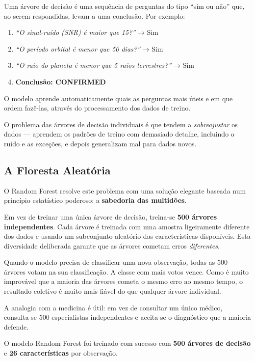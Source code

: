 \documentclass[12pt, a4paper]{report}
\begin{document}
Uma árvore de decisão é uma sequência de perguntas do tipo ``sim ou não'' que, ao serem respondidas, levam a uma conclusão. Por exemplo:

\begin{enumerate}
    \item \textit{``O sinal-ruído (SNR) é maior que 15?''} → Sim
    \item \textit{``O período orbital é menor que 50 dias?''} → Sim
    \item \textit{``O raio do planeta é menor que 5 raios terrestres?''} → Sim
    \item \textbf{Conclusão: CONFIRMED}
\end{enumerate}

O modelo aprende automaticamente quais as perguntas mais úteis e em que ordem fazê-las, através do processamento dos dados de treino.

O problema das árvores de decisão individuais é que tendem a \textit{sobreajustar} os dados — aprendem os padrões de treino com demasiado detalhe, incluindo o ruído e as exceções, e depois generalizam mal para dados novos.

\subsection{A Floresta Aleatória}

O Random Forest resolve este problema com uma solução elegante baseada num princípio estatístico poderoso: a \textbf{sabedoria das multidões}.

Em vez de treinar uma única árvore de decisão, treina-se \textbf{500 árvores independentes}. Cada árvore é treinada com uma amostra ligeiramente diferente dos dados e usando um subconjunto aleatório das características disponíveis. Esta diversidade deliberada garante que as árvores cometam erros \textit{diferentes}.

Quando o modelo precisa de classificar uma nova observação, todas as 500 árvores votam na sua classificação. A classe com mais votos vence. Como é muito improvável que a maioria das árvores cometa o mesmo erro ao mesmo tempo, o resultado coletivo é muito mais fiável do que qualquer árvore individual.

A analogia com a medicina é útil: em vez de consultar um único médico, consulta-se 500 especialistas independentes e aceita-se o diagnóstico que a maioria defende.

\begin{caixaresultado}
O modelo Random Forest foi treinado com sucesso com \textbf{500 árvores de decisão} e \textbf{26 características} por observação.
\end{caixaresultado}
\end{document}
